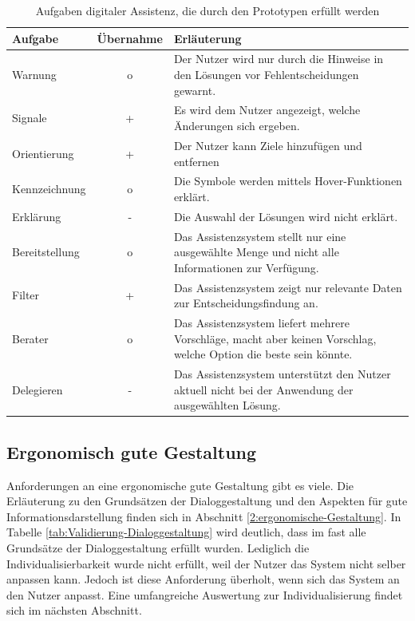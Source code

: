 \begin{table}[htb]
\caption{Aufgaben digitaler Assistenz, die durch den Prototypen erfüllt werden}
\centering
\begin{tabular}{l|c|p{}}
\textbf{Aufgabe} & \textbf{Übernahme} & \textbf{Erläuterung} \\
\hline
Warnung & o & Der Nutzer wird nur durch die Hinweise in den Lösungen vor Fehlentscheidungen gewarnt.\\
\hline
Signale & + & Es wird dem Nutzer angezeigt, welche Änderungen sich ergeben.\\
\hline
Orientierung & + & Der Nutzer kann Ziele hinzufügen und entfernen \\
\hline
Kennzeichnung & o & Die Symbole werden mittels Hover-Funktionen erklärt.\\
\hline
Erklärung & - & Die Auswahl der Lösungen wird nicht erklärt.\\
\hline
Bereitstellung & o & Das Assistenzsystem stellt nur eine ausgewählte Menge und nicht alle Informationen zur Verfügung.\\
\hline
Filter & + & Das Assistenzsystem zeigt nur relevante Daten zur Entscheidungsfindung an.\\
\hline
Berater & o & Das Assistenzsystem liefert mehrere Vorschläge, macht aber keinen Vorschlag, welche Option die beste sein könnte. \\
\hline
Delegieren & - & Das Assistenzsystem unterstützt den Nutzer aktuell nicht bei der Anwendung der ausgewählten Lösung.\\
\end{tabular}
\label{tab:Aufgaben-Assistenz-Prototyp}
\end{table}

\subsection*{Ergonomisch gute Gestaltung}
Anforderungen an eine ergonomische gute Gestaltung gibt es viele. Die Erläuterung zu den Grundsätzen der Dialoggestaltung und den Aspekten für gute Informationsdarstellung finden sich in Abschnitt \ref{2:ergonomische-Gestaltung}. In Tabelle \ref{tab:Validierung-Dialoggestaltung} wird deutlich, dass im fast alle Grundsätze der Dialoggestaltung erfüllt wurden. Lediglich die Individualisierbarkeit wurde nicht erfüllt, weil der Nutzer das System nicht selber anpassen kann. Jedoch ist diese Anforderung überholt, wenn sich das System an den Nutzer anpasst. Eine umfangreiche Auswertung zur Individualisierung findet sich im nächsten Abschnitt.

